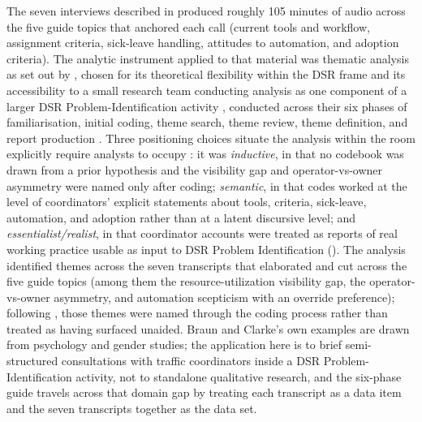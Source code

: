 The seven interviews described in  produced roughly 105 minutes of audio across the five guide topics that anchored each call (current tools and workflow, assignment criteria, sick-leave handling, attitudes to automation, and adoption criteria). The analytic instrument applied to that material was thematic analysis as set out by \textcite{braun2006thematic}, chosen for its theoretical flexibility within the DSR frame \parencite[p.~81]{braun2006thematic} and its accessibility to a small research team conducting analysis as one component of a larger DSR Problem-Identification activity \parencite[p.~77]{braun2006thematic}, conducted across their six phases of familiarisation, initial coding, theme search, theme review, theme definition, and report production \parencite[p.~87]{braun2006thematic}. Three positioning choices situate the analysis within the room \textcite{braun2006thematic} explicitly require analysts to occupy \parencite[pp.~81--82]{braun2006thematic}: it was \emph{inductive}, in that no codebook was drawn from a prior hypothesis and the visibility gap and operator-vs-owner asymmetry were named only after coding; \emph{semantic}, in that codes worked at the level of coordinators' explicit statements about tools, criteria, sick-leave, automation, and adoption rather than at a latent discursive level; and \emph{essentialist/realist}, in that coordinator accounts were treated as reports of real working practice usable as input to DSR Problem Identification (). The analysis identified themes across the seven transcripts that elaborated and cut across the five guide topics (among them the resource-utilization visibility gap, the operator-vs-owner asymmetry, and automation scepticism with an override preference); following \textcite[Table~2, criterion~15]{braun2006thematic}, those themes were named through the coding process rather than treated as having surfaced unaided. Braun and Clarke's own examples are drawn from psychology and gender studies; the application here is to brief semi-structured consultations with traffic coordinators inside a DSR Problem-Identification activity, not to standalone qualitative research, and the six-phase guide travels across that domain gap by treating each transcript as a data item and the seven transcripts together as the data set.

